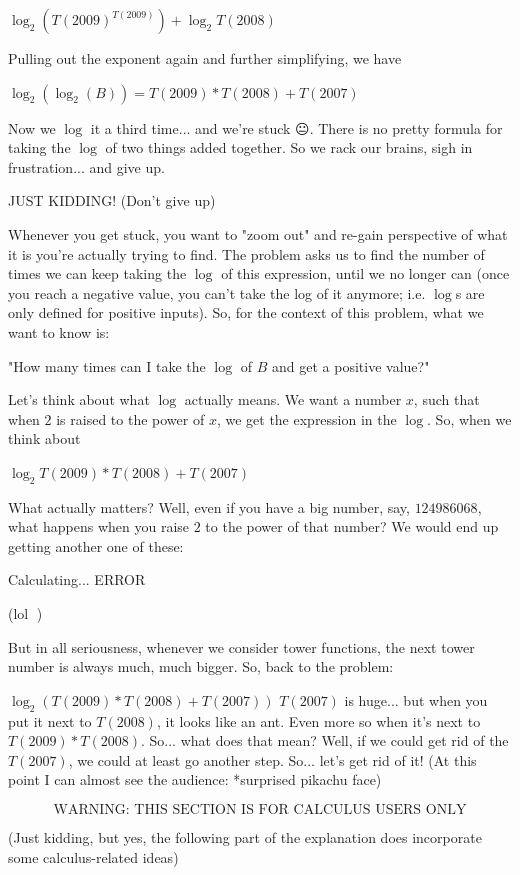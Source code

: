 \begin{enumerate}
 
$\log_2{(T(2009)^{T(2009)})} + \log_2{T(2008)}$

 
Pulling out the exponent again and further simplifying, we have

 
$\log_2{(\log_2{(B)})} = T(2009)*T(2008)+T(2007)$

 
Now we $\log$ it a third time... and we're stuck 😐. There is no pretty formula for taking the $\log$ of two things added together. So we rack our brains, sigh in frustration... and give up.

 JUST KIDDING! (Don't give up)

 Whenever you get stuck, you want to "zoom out" and re-gain perspective of what it is you're actually trying to find. The problem asks us to find the number of times we can keep taking the $\log$ of this expression, until we no longer can (once you reach a negative value, you can't take the log of it anymore; i.e. $\log$s are only defined for positive inputs). So, for the context of this problem, what we want to know is:

 
"How many times can I take the $\log$ of $B$ and get a positive value?"

 
Let's think about what $\log$ actually means. We want a number $x$, such that when $2$ is raised to the power of $x$, we get the expression in the $\log$. So, when we think about

 
$\log_2{T(2009)*T(2008)+T(2007)}$

 
What actually matters? Well, even if you have a big number, say, $124986068$, what happens when you raise $2$ to the power of that number? We would end up getting another one of these:

 
Calculating... ERROR

 
(lol 🤣)

 But in all seriousness, whenever we consider tower functions, the next tower number is always much, much bigger. So, back to the problem:

 
$\log_2{(T(2009)*T(2008)+T(2007))}$
$T(2007)$ is huge... but when you put it next to $T(2008)$, it looks like an ant. Even more so when it's next to $T(2009)*T(2008)$. So... what does that mean? Well, if we could get rid of the $T(2007)$, we could at least go another step. So... let's get rid of it! (At this point I can almost see the audience: *surprised pikachu face)

 
 \[\text{WARNING: THIS SECTION IS FOR CALCULUS USERS ONLY}\]

 (Just kidding, but yes, the following part of the explanation does incorporate some calculus-related ideas)


\end{enumerate}
